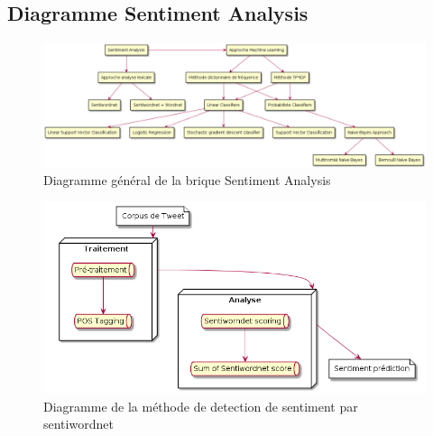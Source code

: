 \subsection {Diagramme Sentiment Analysis}
\begin{figure}[h!]
	\centerline{\includegraphics[scale=0.4]{img/diagramme_sentiment_analysis.png}}
	\caption{Diagramme général de la brique Sentiment Analysis}
\end{figure}


\begin{figure}[h!]
	\centerline{\includegraphics[scale=0.6]{img/diagramme_sentiwordnet.png}}
	\caption{Diagramme de la méthode de detection de sentiment par sentiwordnet}
\end{figure}
